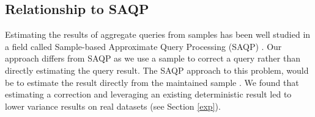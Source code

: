 \subsection{Relationship to SAQP}
Estimating the results of aggregate queries from samples has been
well studied in a field called Sample-based Approximate Query Processing
(SAQP) \cite{OlkenR86,AgarwalMPMMS13}.
Our approach differs from SAQP as we use a sample to correct a query rather than directly estimating the query result.
The SAQP approach to this problem, would be to
estimate the result directly from the maintained sample \cite{joshi2008materialized}.
We found that estimating
a correction and leveraging an existing deterministic result led
to lower variance results on real datasets (see Section \ref{exp}). 




